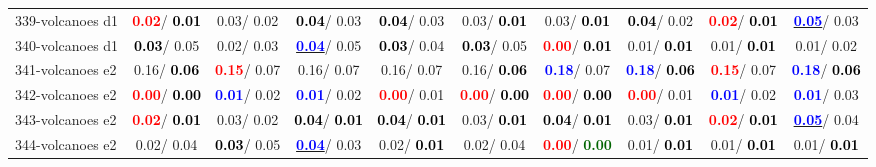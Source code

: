 \begin{table}[h]
\begin{center}
{\begin{tabular}{lc|c|c|c|c|c|c|c|c}
339-volcanoes d1 & \textcolor{red}{\textbf{  0.02}}/\textcolor{black}{\textbf{  0.01}} &   0.03/  0.02 & \textcolor{black}{\textbf{  0.04}}/  0.03 & \textcolor{black}{\textbf{  0.04}}/  0.03 &   0.03/\textcolor{black}{\textbf{  0.01}} &   0.03/\textcolor{black}{\textbf{  0.01}} & \textcolor{black}{\textbf{  0.04}}/  0.02 & \textcolor{red}{\textbf{  0.02}}/\textcolor{black}{\textbf{  0.01}} & \underline{\textcolor{blue}{\textbf{  0.05}}}/  0.03 \\
340-volcanoes d1 & \textcolor{black}{\textbf{  0.03}}/  0.05 &   0.02/  0.03 & \underline{\textcolor{blue}{\textbf{  0.04}}}/  0.05 & \textcolor{black}{\textbf{  0.03}}/  0.04 & \textcolor{black}{\textbf{  0.03}}/  0.05 & \textcolor{red}{\textbf{  0.00}}/\textcolor{black}{\textbf{  0.01}} &   0.01/\textcolor{black}{\textbf{  0.01}} &   0.01/\textcolor{black}{\textbf{  0.01}} &   0.01/  0.02 \\
341-volcanoes e2 &   0.16/\textcolor{black}{\textbf{  0.06}} & \textcolor{red}{\textbf{  0.15}}/  0.07 &   0.16/  0.07 &   0.16/  0.07 &   0.16/\textcolor{black}{\textbf{  0.06}} & \textcolor{blue}{\textbf{  0.18}}/  0.07 & \textcolor{blue}{\textbf{  0.18}}/\textcolor{black}{\textbf{  0.06}} & \textcolor{red}{\textbf{  0.15}}/  0.07 & \textcolor{blue}{\textbf{  0.18}}/\textcolor{black}{\textbf{  0.06}} \\ \hline
342-volcanoes e2 & \textcolor{red}{\textbf{  0.00}}/\textcolor{black}{\textbf{  0.00}} & \textcolor{blue}{\textbf{  0.01}}/  0.02 & \textcolor{blue}{\textbf{  0.01}}/  0.02 & \textcolor{red}{\textbf{  0.00}}/  0.01 & \textcolor{red}{\textbf{  0.00}}/\textcolor{black}{\textbf{  0.00}} & \textcolor{red}{\textbf{  0.00}}/\textcolor{black}{\textbf{  0.00}} & \textcolor{red}{\textbf{  0.00}}/  0.01 & \textcolor{blue}{\textbf{  0.01}}/  0.02 & \textcolor{blue}{\textbf{  0.01}}/  0.03 \\
343-volcanoes e2 & \textcolor{red}{\textbf{  0.02}}/\textcolor{black}{\textbf{  0.01}} &   0.03/  0.02 & \textcolor{black}{\textbf{  0.04}}/\textcolor{black}{\textbf{  0.01}} & \textcolor{black}{\textbf{  0.04}}/\textcolor{black}{\textbf{  0.01}} &   0.03/\textcolor{black}{\textbf{  0.01}} & \textcolor{black}{\textbf{  0.04}}/\textcolor{black}{\textbf{  0.01}} &   0.03/\textcolor{black}{\textbf{  0.01}} & \textcolor{red}{\textbf{  0.02}}/\textcolor{black}{\textbf{  0.01}} & \underline{\textcolor{blue}{\textbf{  0.05}}}/  0.04 \\
344-volcanoes e2 &   0.02/  0.04 & \textcolor{black}{\textbf{  0.03}}/  0.05 & \underline{\textcolor{blue}{\textbf{  0.04}}}/  0.03 &   0.02/\textcolor{black}{\textbf{  0.01}} &   0.02/  0.04 & \textcolor{red}{\textbf{  0.00}}/\textcolor{darkgreen}{\textbf{  0.00}} &   0.01/\textcolor{black}{\textbf{  0.01}} &   0.01/\textcolor{black}{\textbf{  0.01}} &   0.01/\textcolor{black}{\textbf{  0.01}} \\

\end{tabular}}
\end{center}
\end{table}
